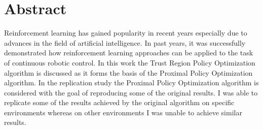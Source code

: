 \chapter*{Abstract}
Reinforcement learning has gained popularity in recent years especially due to advances in the field of artificial intelligence.
In past years, it was successfully demonstrated how reinforcement learning approaches can be applied to the task
of continuous robotic control.
In this work the Trust Region Policy Optimization algorithm is discussed as it forms the basis of the Proximal Policy Optimization
algorithm.
In the replication study the Proximal Policy Optimization algorithm is considered with the goal of reproducing some of the original results.
I was able to replicate some of the results achieved by the original algorithm on specific environments whereas on other
environments I was unable to achieve similar results.